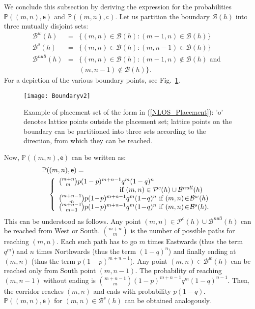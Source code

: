 \documentclass[conference]{IEEEtran}
\begin{document}
We conclude this subsection by deriving the expression for the probabilities 
$\mathbb{P}((m,n),\mathsf{e})$ and $\mathbb{P}((m,n),\mathsf{c})$. Let us partition the 
boundary $\mathcal{B}(h)$ into three mutually disjoint sets:
\begin{eqnarray*}
\mathcal{B}^w(h)&=&\{(m,n)\in \mathcal{B}(h): (m-1,n)\in \mathcal{B}(h)\}\\
\mathcal{B}^s(h)&=&\{(m,n)\in \mathcal{B}(h): (m,n-1)\in \mathcal{B}(h)\}\\
\mathcal{B}^{null}(h)&=&\{(m,n)\in \mathcal{B}(h): (m-1,n)\notin \mathcal{B}(h)\mbox{ and }\nonumber\\
&&(m,n-1)\notin \mathcal{B}(h)\}.
\end{eqnarray*}
For a depiction of the various boundary points, see Fig.~\ref{Boundary_figure}.
\begin{figure}[t!]
\centering
\texttt{[image: Boundaryv2]}
\caption{Example of placement set of the form in (\ref{NLOS_Placement}): 'o' denotes lattice 
points outside the placement set; lattice points on the boundary can be partitioned into three 
sets according to the direction, from which they can be reached.}
\label{Boundary_figure}
\end{figure}
Now, $\mathbb P((m,n),\mathsf{e})$ can be written as:
\begin{eqnarray*}
\lefteqn{\mathbb P((m,n),\mathsf{e})=}\\
&&\left\{\begin{array}{lr}
\binom{m+n}{m}p(1-p)^{m+n-1}q^m(1-q)^n \\
\hspace{30mm}\mbox{ if } (m,n)\in \mathcal{P}^c(h)\cup \mathcal{B}^{null}(h)\\
\binom{m+n-1}{m} p(1\!-\!p)^{m+n-1} q^m(1\!-\!q)^n \mbox{ if }(m,n)\!\in\! \mathcal{B}^{w}(h)\\
\binom{m+n-1}{m-1} p(1\!-\!p)^{m+n-1} q^m(1\!-\!q)^n \mbox{ if }(m,n)\!\in\! \mathcal{B}^{s}(h).
\end{array}\right.
\end{eqnarray*}
This can be understood as follows. Any point $(m,n)\in \mathcal{P}^c(h)\cup 
\mathcal{B}^{null}(h)$ can be reached from West or South. $\binom{m+n}{m}$ is the number of 
possible paths for reaching $(m,n)$. Each such path has to go $m$ times Eastwards (thus the 
term $q^m$) and $n$ times Northwards (thus the term $(1-q)^n$) and finally ending at $(m,n)$ 
(thus the term $p(1-p)^{m+n-1}$). Any point $(m,n)\in \mathcal{B}^{w}(h)$ can be reached only 
from South point $(m,n-1)$. The probability of reaching $(m,n-1)$ without ending is 
$\binom{m+n-1}{m} (1-p)^{m+n-1} q^m(1-q)^{n-1}$. Then, the corridor reaches $(m,n)$ and ends 
with probability $p(1-q)$. $\mathbb P((m,n),\mathsf{e})$ for $(m,n) \in \mathcal{B}^{s}(h)$ can 
be obtained analogously. 
\end{document}

